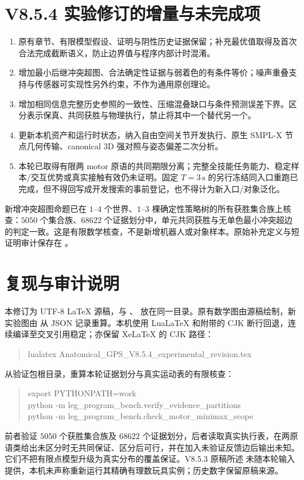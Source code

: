 \documentclass[11pt,a4paper,fontset=fandol]{ctexart}
\theoremstyle{definition}
\theoremstyle{remark}\newtheorem{remark}[theorem]{说明}
\numberwithin{equation}{section}
\begin{document}
\section{V8.5.4 实验修订的增量与未完成项}
\begin{enumerate}
\item 原有章节、有限模型假设、证明与阴性历史证据保留；补充最优值取得及首次合法完成截断语义，防止边界值与程序内部计时混淆。
\item 增加最小后继冲突超图、合法确定性证据与弱着色的有条件等价；噪声重叠支持与传感器可实现性另外约束，不作为通用原创理论。
\item 增加相同信息完整历史参照的一致性、压缩混叠缺口与条件预测误差下界。区分表示保真、共同获胜与物理执行，禁止将其中一个替代另一个。
\item 更新本机资产和运行时状态，纳入自由空间关节开发执行、原生 SMPL-X 节点几何传输、canonical 3D 强对照与姿态偏差二次分析。
\item 本轮已取得有限两 motor 原语的共同期限分离；完整全技能任务能力、稳定样本/交互优势或真实接触有效仍未证明。固定 $T=3\,\mathrm{s}$ 的另行冻结同入口重跑已完成，但不得回写成开发搜索的事前登记，也不得计为新入口/对象泛化。
\end{enumerate}
新增冲突超图命题已在 $1$--$4$ 个世界、$1$--$3$ 棵确定性策略树的所有获胜集合族上核查：$5050$ 个集合族、$68622$ 个证据划分中，单元共同获胜与无单色最小冲突超边的判定一致。这是有限数学核查，不是新增机器人或对象样本。原始补充定义与短证明审计保存在 。

\section{复现与审计说明}
本修订为 UTF-8 LaTeX 源稿，与 、 放在同一目录。原有数学图由源稿绘制，新实验图由  从 JSON 记录重算。本机使用 LuaLaTeX 和附带的 CJK 断行回退，连续编译至交叉引用稳定；亦保留 XeLaTeX 的 CJK 路径：
\begin{quote}\small\ttfamily
lualatex Anatomical\_GPS\_V8.5.4\_experimental\_revision.tex
\end{quote}
从验证包根目录，重算本轮证据划分与真实运动表的有限核查：
\begin{quote}\small\ttfamily
export PYTHONPATH=work\\
python -m leg\_program\_bench.verify\_evidence\_partitions\\
python -m leg\_program\_bench.check\_motor\_minimax\_scope
\end{quote}
前者验证 $5050$ 个获胜集合族及 $68622$ 个证据划分，后者读取真实执行表，在两原语类给出未区分时无共同保证、区分后可行，并在加入未验证反馈边后输出未知。它们不把有限点模型升级为真实分布的覆盖保证。V8.5.3 原稿所述  未随本轮输入提供，本机未声称重新运行其精确有理数玩具实例；历史数字保留原稿来源。
\end{document}
